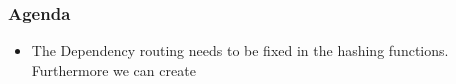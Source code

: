 \begin{frame}
  \frametitle{Agenda}
  \begin{itemize}
  \item The Dependency routing needs to be fixed in the hashing functions. Furthermore we can create
  \end{itemize}
\end{frame}
